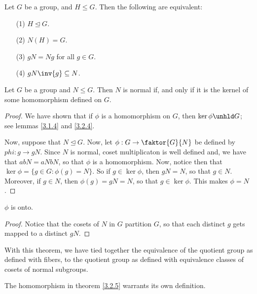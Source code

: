 \begin{lemma}\label{3.2.4}
    Let $G$ be a group, and  $H \leq G$. Then the following are equivalent:
    \begin{enumerate}
        \item[(1)] $H \unlhd G$.

        \item [(2)] $N(H)=G$.

        \item[(3)] $gN=Ng$ for all  $g \in G$.

        \item [(4)] $gN\inv{g} \subseteq N$.
    \end{enumerate}
\end{lemma}

\begin{theorem}\label{3.2.5}
    Let $G$ be a group and  $N \leq G$. Then  $N$ is normal if, and only if it
    is the kernel of some homomorphism defined on $G$.
\end{theorem}
\begin{proof}
    We have shown that if $\phi$ is a homomorphism on  $G$, then  $\ker{\phi}
    \unhld G$; see lemmas \ref{3.1.4} and \ref{3.2.4}.

    Now, suppose that $N \unlhd G$. Now, let $\phi:G \rightarrow \faktor{G}{N}$
    be defined by $phi:g \rightarrow gN$. Since $N$ is normal, coset
    multiplicaton is well defined and, we have that $abN=aNbN$, so that $\phi$
    is a homomorphism. Now, notice then that
    $\ker{\phi}=\{g \in G : \phi(g)=N\}$. So if $g \in \ker{\phi}$, then $gN=N$,
    so that $g \in N$. Moreover, if  $g \in N$, then  $\phi(g)=gN=N$, so that $g
    \in \ker{\phi}$. This makes $\phi=N$.
\end{proof}
\begin{corollary}
    $\phi$ is onto.
\end{corollary}
\begin{proof}
    Notice that the cosets of $N$ in  $G$ partition  $G$, so that each distinct
    $g$ gets mapped to a distinct $gN$.
\end{proof}
\begin{remark}
    With this theorem, we have tied together the equivalence of the quotient
    group as defined with fibers, to the quotient group as defined with
    equivalence classes of cosets of normal subgroups.
\end{remark}

The homomorphism in theorem \ref{3.2.5} warrants its own definition.


